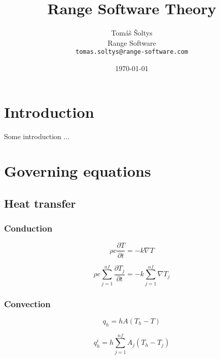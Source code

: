 \documentclass[a4paper,10pt]{book}
\title{Range Software Theory}
\author{Tom\'{a}\v{s} \v{S}oltys\\
  Range Software\\
  \texttt{tomas.soltys@range-software.com}}
\date{\today}
\begin{document}
\frontmatter


\thispagestyle{empty}
\maketitle


\setcounter{tocdepth}{2}
\tableofcontents

\mainmatter


\chapter{Introduction}
Some introduction ...


\chapter{Governing equations}

\section{Heat transfer}

\subsection{Conduction}

    \begin{equation}
    \rho{c}\frac{\partial{T}}{\partial{t}}=-k\nabla{T}
    \end{equation}

    \begin{equation}
    \rho{c}\sum_{j=1}^{nf}\frac{\partial{T_j}}{\partial{t}}=-k\sum_{j=1}^{nf}\nabla{T_j}
    \end{equation}

\subsection{Convection}

    \begin{equation}
    q_h=hA\left(T_h-T\right)
    \end{equation}

    \begin{equation}
    q_h^i=h\sum_{j=1}^{nf}A_j\left(T_h-T_j\right)
    \end{equation}
\end{document}

